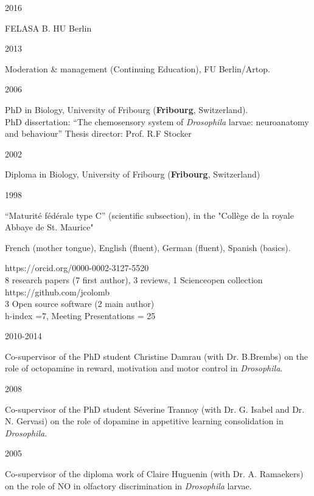    \newpage     
{}
\parbox{0.15\textwidth}{2016}\hfill
\parbox[t]{0.83\textwidth}{FELASA B. HU Berlin
        }
\parbox{0.15\textwidth}{2013}\hfill
\parbox[t]{0.83\textwidth}{Moderation \& management (Continuing Education), FU Berlin/Artop.
        }
\parbox{0.15\textwidth}{2006}\hfill
\parbox[t]{0.83\textwidth}{PhD in Biology,
        University of Fribourg (\textbf{Fribourg}, Switzerland).\\
        PhD dissertation: ``The chemosensory system of \textit{Drosophila} larvae: neuroanatomy and behaviour''
        Thesis director: Prof. R.F Stocker}
\parbox{0.15\textwidth}{2002}\hfill
\parbox[t]{0.83\textwidth}{Diploma in Biology,
        University of Fribourg (\textbf{Fribourg}, Switzerland)
        }
\parbox{0.15\textwidth}{1998}\hfill
\parbox[t]{0.83\textwidth}{``Maturit\'e f\'ed\'erale type C'' (scientific subsection),
in the "Coll\`ege de la royale Abbaye de St. Maurice"}



 French (mother tongue), English (fluent),
German (fluent), Spanish (basics).

%
 https://orcid.org/0000-0002-3127-5520\\
  8 research papers (7 first author), 3 reviews, 1 Scienceopen collection\\
 https://github.com/jcolomb\\
 3 Open source software (2 main author)\\
h-index =7,
Meeting Presentations = 25




\parbox{0.15\textwidth}{2010-2014}\hfill
	\parbox[t]{0.83\textwidth}{Co-supervisor of the PhD student Christine Damrau
(with Dr. B.Brembs) on the role of octopamine in reward, motivation and motor control in  \textit{Drosophila}.}
\parbox{0.15\textwidth}{2008}\hfill
	\parbox[t]{0.83\textwidth}{Co-supervisor of the PhD student S\'everine Trannoy
(with Dr. G. Isabel and Dr. N. Gervasi) on the role of dopamine in appetitive learning consolidation in  \textit{Drosophila}.}
\parbox{0.15\textwidth}{2005}\hfill
\parbox[t]{0.83\textwidth}{Co-supervisor of the diploma work of Claire Huguenin
(with Dr. A. Ramaekers) on the role of NO in olfactory discrimination in \textit{Drosophila} larvae.}





